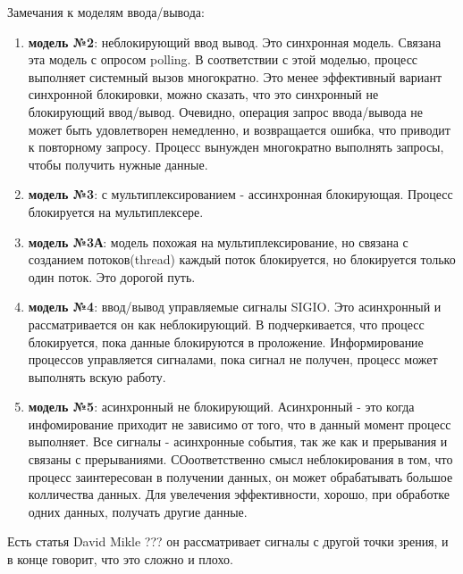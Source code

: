 Замечания к моделям ввода/вывода:
\begin{enumerate}
	\item \textbf{модель №2}: неблокирующий ввод вывод. Это синхронная модель. Связана эта модель с опросом polling. В соответствии с этой моделью, процесс выполняет системный вызов многократно. Это менее эффективный вариант синхронной блокировки, можно сказать, что это синхронный не блокирующий ввод/вывод. Очевидно, операция запрос ввода/вывода не может быть удовлетворен немедленно, и возвращается ошибка, что приводит к повторному запросу. Процесс вынужден многократно выполнять запросы, чтобы получить нужные данные.

	\item \textbf{модель №3}: с мультиплексированием - ассинхронная блокирующая. Процесс блокируется на мультиплексере.  

	\item \textbf{модель №3А}: модель похожая на мультиплексирование, но связана с созданием потоков(thread) каждый поток блокируется, но блокируется только один поток. Это дорогой путь.

	\item \textbf{модель №4}: ввод/вывод управляемые сигналы SIGIO. Это асинхронный и рассматривается он как неблокирующий. В \cite{UNIX_Stiv_net_app} подчеркивается, что процесс блокируется, пока данные блокируются в проложение. Информирование процессов управляется сигналами, пока сигнал не получен, процесс может выполнять вскую работу.

	\item \textbf{модель №5}: асинхронный не блокирующий. Асинхронный - это когда инфомирование приходит не зависимо от того, что в данный момент процесс выполняет. Все сигналы - асинхронные события, так же как и прерывания и связаны с прерываниями. СОоответственно смысл неблокирования в том, что процесс заинтересован в получении данных, он может обрабатывать большое колличества данных. Для увелечения эффективности, хорошо, при обработке одних данных, получать другие данные.
\end{enumerate}

Есть статья David Mikle ??? он рассматривает сигналы с другой точки зрения, и в конце говорит, что это сложно и плохо.  
